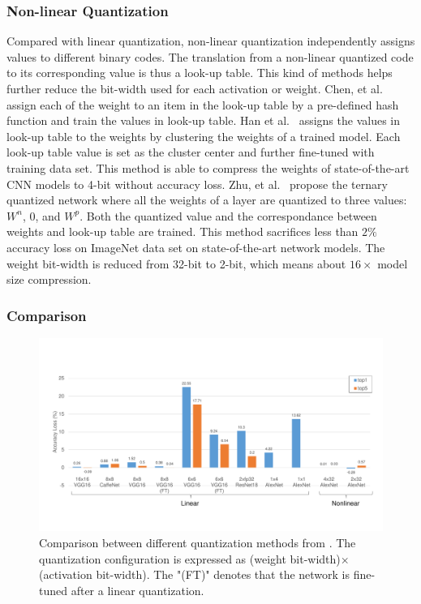 \subsubsection{Non-linear Quantization}
Compared with linear quantization, non-linear quantization independently assigns values to different binary codes. The translation from a non-linear quantized code to its corresponding value is thus a look-up table. This kind of methods helps further reduce the bit-width used for each activation or weight. Chen, et al.~\cite{chen2015compressing} assign each of the weight to an item in the look-up table by a pre-defined hash function and train the values in look-up table. Han et al.~\cite{han2015deep} assigns the values in look-up table to the weights by clustering the weights of a trained model. Each look-up table value is set as the cluster center and further fine-tuned with training data set. This method is able to compress the weights of state-of-the-art CNN models to 4-bit without accuracy loss. Zhu, et al.~\cite{zhu2016trained} propose the ternary quantized network where all the weights of a layer are quantized to three values: $W^n$, 0, and $W^p$. Both the quantized value and the correspondance between weights and look-up table are trained. This method sacrifices less than $2\%$ accuracy loss on ImageNet data set on state-of-the-art network models. The weight bit-width is reduced from 32-bit to 2-bit, which means about $16\times$ model size compression.

\subsubsection{Comparison}
\begin{figure}[ht]
    \centering
    \includegraphics[width=1.0\columnwidth]{fig/quantization.pdf}
    \caption{Comparison between different quantization methods from \cite{qiu2016going, guo2017angel, han2015deep, zhu2016trained, zhou2016dorefa, li2016ternary}. The quantization configuration is expressed as (weight bit-width)$\times$(activation bit-width). The "(FT)" denotes that the network is fine-tuned after a linear quantization.}
    \label{fig:quantization}
\end{figure}

